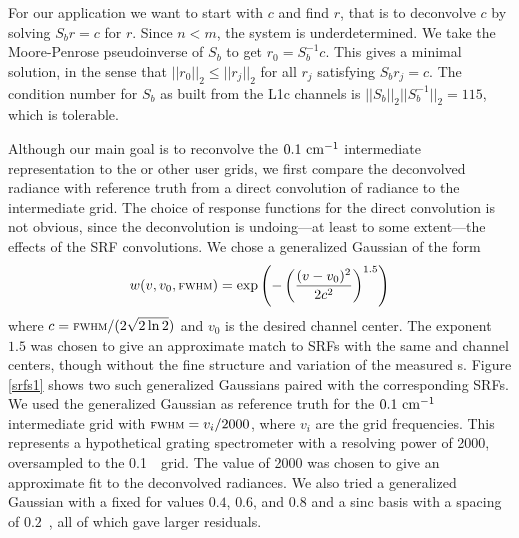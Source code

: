 \documentclass[10pt,twocolumn]{article}
\begin{document}
For our application we want to start with $c$ and find $r$, that is
to deconvolve $c$ by solving $S_b r = c$ for $r$.  Since $n < m$, the
system is underdetermined.  We take the Moore-Penrose pseudoinverse
\cite{strang:linalg} of $S_b$ to get $r_0 = S_b^{-1} c$.  This gives a
minimal solution, in the sense that $||r_0||_2 \le ||r_j||_2$ for
all $r_j$ satisfying $S_b r_j = c$.  The condition number for $S_b$
as built from the L1c channels is $||S_b||_2||S_b^{-1}||_2 = 115$,
which is tolerable.

Although our main goal is to reconvolve the $0.1~\mbox{cm$^{-1}$}$ intermediate
representation to the {\cris} or other user grids, we first compare
the deconvolved radiance with reference truth from a direct
convolution of {\kcarta} radiance to the intermediate grid.  The
choice of response functions for the direct convolution is not
obvious, since the deconvolution is undoing---at least to some
extent---the effects of the {\airs} SRF convolutions.  We chose a
generalized Gaussian \cite{wiki:gauss} of the form
\[w(v, v_0, \mbox{\small\textsc{fwhm}}) = 
\exp\left(-\left(\frac{(v - v_0)^2}{2c^2}\right)^{1.5}\right) \]
where $c=\mbox{\small\textsc{fwhm}} / (2\sqrt{2\ln 2})$ and $v_0$ is the desired channel
center.  The exponent $1.5$ was chosen to give an approximate match
to {\airs} SRFs with the same {\FWHM} and channel centers, though
without the fine structure and variation of the measured \srf s.
Figure \ref{srfs1} shows two such generalized Gaussians paired with
the corresponding {\airs} SRFs.  We used the generalized Gaussian as
reference truth for the $0.1~\mbox{cm$^{-1}$}$ intermediate grid with ${\mbox{\small\textsc{fwhm}}} =
v_i / 2000$, where $v_i$ are the grid frequencies.  This represents
a hypothetical grating spectrometer with a resolving power of 2000,
oversampled to the 0.1~\wn\ grid.  The value of 2000 was chosen to
give an approximate fit to the deconvolved radiances.  We also tried
a generalized Gaussian with a fixed {\FWHM} for values $0.4$, $0.6$,
and $0.8$ and a sinc basis with a spacing of $0.2$~\wn, all of which
gave larger residuals.
\end{document}
